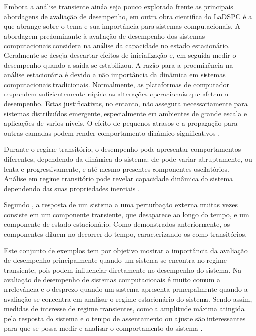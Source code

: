 Embora a análise transiente ainda seja pouco explorada frente as principais abordagens de avaliação de desempenho, em outra obra cientifica do LaDSPC é a  que abrange sobre o tema e sua importância para sistemas computacionais. A abordagem predominante à avaliação de desempenho dos sistemas computacionais considera na análise da capacidade no estado estacionário. Geralmente se deseja descartar efeitos de inicialização e, em seguida medir o desempenho quando a saída se estabilizou. A razão para a proeminência na análise estacionária é devido a não importância da dinâmica em sistemas computacionais tradicionais. Normalmente, as plataformas de computador respondem suficientemente rápido as alterações operacionais que afetem o desempenho. Estas justificativas, no entanto, não assegura necessariamente para sistemas distribuídos emergente, especialmente em ambientes de grande escala e aplicações de vários níveis. O efeito de pequenos atrasos e a propagação para outras camadas podem render comportamento dinâmico significativos \cite{Lourenco2015}.

Durante o regime transitório, o desempenho pode apresentar comportamentos diferentes, dependendo da dinâmica do sistema: ele pode variar abruptamente, ou lenta e progressivamente, e até mesmo presentes componentes oscilatórios. Análise em regime transitório pode revelar capacidade dinâmica do sistema dependendo das suas propriedades inerciais \cite{Lourenco2015}.

Segundo , a resposta de um sistema a uma perturbação externa muitas vezes consiste em um componente transiente, que desaparece ao longo do tempo, e um componente de estado estacionário. Como demonstrados anteriormente, os componentes diluem no decorrer do tempo, caracterizando-os como transitórios. 

Este conjunto de exemplos tem por objetivo mostrar a importância da avaliação de desempenho principalmente quando um sistema se encontra no regime transiente, pois podem influenciar diretamente no desempenho do sistema. Na avaliação de desempenho de sistemas computacionais é muito comum a irrelevância e o desprezo quando um sistema apresenta  principalmente quando a avaliação se concentra em analisar o regime estacionário do sistema. Sendo assim, medidas de interesse de regime transientes, como a amplitude máxima atingida pela resposta do sistema e o tempo de assentamento ou ajuste são interessantes para que se possa medir e analisar o comportamento do sistema \cite{Nobile2013}.

